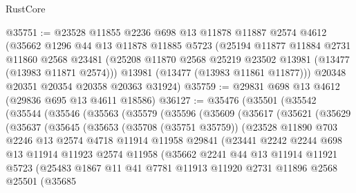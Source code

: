 \begin{lexlean}{RustCore}
\begin{coremodule}
@35751 := @23528
    @11855
    @2236
    @698
    @13
    @11878
    @11887
    @2574
    @4612
    (@35662
      @1296
      @44
      @13
      @11878
      @11885
      @5723
      (@25194
        @11877
        @11884
        @2731
        @11860
        @2568
        @23481
        (@25208 @11870 @2568 @25219 @23502 @13981 (@13477 (@13983 @11871 @2574)))
        @13981
        (@13477 (@13983 @11861 @11877)))
      @20348
      @20351
      @20354
      @20358
      @20363
      @31924)
@35759 := @29831 @698 @13 @4612 (@29836 @695 @13 @4611 @18586)
@36127 := @35476
    (@35501
      (@35542
        (@35544
          (@35546
            (@35563
              (@35579
                (@35596
                  (@35609
                    (@35617
                      (@35621
                        (@35629
                          (@35637
                            (@35645
                              (@35653
                                (@35708 (@35751 @35759))
                                (@23528
                                  @11890
                                  @703
                                  @2246
                                  @13
                                  @2574
                                  @4718
                                  @11914
                                  @11958
                                  @29841
                                  (@23441
                                    @2242
                                    @2244
                                    @698
                                    @13
                                    @11914
                                    @11923
                                    @2574
                                    @11958
                                    (@35662
                                      @2241
                                      @44
                                      @13
                                      @11914
                                      @11921
                                      @5723
                                      (@25483
                                        @1867
                                        @11
                                        @41
                                        @7781
                                        @11913
                                        @11920
                                        @2731
                                        @11896
                                        @2568
                                        @25501
                                        (@35685

\end{coremodule}
\end{lexlean}
